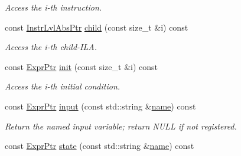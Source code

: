 \begin{DoxyCompactItemize}
\begin{DoxyCompactList}\small\item\em Access the i-\/th instruction. \end{DoxyCompactList}\item 
\mbox{\label{classilang_1_1_instr_lvl_abs_a7ded25cab323c59aff7910bd03a268b5}} 
const \mbox{\hyperlink{classilang_1_1_instr_lvl_abs_a743fd98e5ad145d70cb0dabf8db0007c}{Instr\+Lvl\+Abs\+Ptr}} \mbox{\hyperlink{classilang_1_1_instr_lvl_abs_a7ded25cab323c59aff7910bd03a268b5}{child}} (const size\+\_\+t \&i) const
\begin{DoxyCompactList}\small\item\em Access the i-\/th child-\/\+I\+LA. \end{DoxyCompactList}\item 
\mbox{\label{classilang_1_1_instr_lvl_abs_a35b33274ac498f86bedc57dd959eb730}} 
const \mbox{\hyperlink{namespaceilang_a7c4196c72e53ea4df4b7861af7bc3bce}{Expr\+Ptr}} \mbox{\hyperlink{classilang_1_1_instr_lvl_abs_a35b33274ac498f86bedc57dd959eb730}{init}} (const size\+\_\+t \&i) const
\begin{DoxyCompactList}\small\item\em Access the i-\/th initial condition. \end{DoxyCompactList}\item 
\mbox{\label{classilang_1_1_instr_lvl_abs_a1436c8d8bd4046447f31dfd835e52730}} 
const \mbox{\hyperlink{namespaceilang_a7c4196c72e53ea4df4b7861af7bc3bce}{Expr\+Ptr}} \mbox{\hyperlink{classilang_1_1_instr_lvl_abs_a1436c8d8bd4046447f31dfd835e52730}{input}} (const std\+::string \&\mbox{\hyperlink{classilang_1_1_object_acf20b072e69f572910d7d80c93af0b38}{name}}) const
\begin{DoxyCompactList}\small\item\em Return the named input variable; return N\+U\+LL if not registered. \end{DoxyCompactList}\item 
\mbox{\label{classilang_1_1_instr_lvl_abs_a2d73f0fe6602b095a608327cefdd4476}} 
const \mbox{\hyperlink{namespaceilang_a7c4196c72e53ea4df4b7861af7bc3bce}{Expr\+Ptr}} \mbox{\hyperlink{classilang_1_1_instr_lvl_abs_a2d73f0fe6602b095a608327cefdd4476}{state}} (const std\+::string \&\mbox{\hyperlink{classilang_1_1_object_acf20b072e69f572910d7d80c93af0b38}{name}}) const

\end{DoxyCompactItemize}

